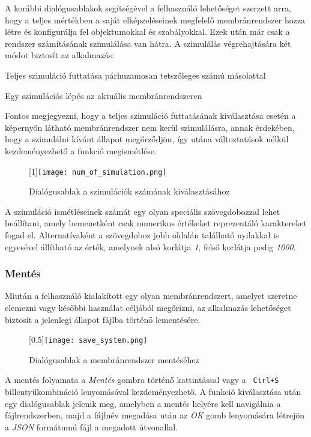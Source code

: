 A korábbi dialógusablakok segítségével a felhasználó lehetőséget szerzett arra, hogy a teljes mértékben a saját elképzeléseinek megfelelő membránrendszer hozza létre és konfigurálja fel objektumokkal és szabályokkal. Ezek után már csak a rendszer számításának szimulálása van hátra. A szimulálás végrehajtására két módot biztosít az alkalmazás:

\begin{compactenum}
\item Teljes szimuláció futtatása párhuzamosan tetszőleges számú másolattal 
\item Egy szimulációs lépés az aktuális membránrendszeren
\end{compactenum}

Fontos megjegyezni, hogy a teljes szimuláció futtatásának kiválasztása esetén a képernyőn látható membránrendszer nem kerül szimulálásra, annak érdekében, hogy a szimulálni kívánt állapot megőrződjön, így utána változtatások nélkül kezdeményezhető a funkció megismétlése.

\begin{figure}[H]
	\centering
	\scalebox{1}[1]{\texttt{[image: num\_of\_simulation.png]}}
	\caption{Dialógusablak a szimulációk számának kiválasztásához}
	\label{fig:num_of_sim}
\end{figure}

A szimuláció ismétléseinek számát egy olyan speciális szövegdobozzal lehet beállítani, amely bemenetként csak numerikus értékeket reprezentáló karaktereket fogad el. Alternatívaként a szövegdoboz jobb oldalán található nyilakkal is egyesével állítható az érték, amelynek alsó korlátja \textit{1}, felső korlátja pedig \textit{1000}.
 
\subsubsection{Mentés}
Miután a felhasználó kialakított egy olyan membránrendszert, amelyet szeretne elemezni vagy későbbi használat céljából megőrizni, az alkalmazás lehetőséget biztosít a jelenlegi állapot fájlba történő lementésére.

\begin{figure}[H]
	\centering
	\scalebox{0.5}[0.5]{\texttt{[image: save\_system.png]}}
	\caption{Dialógusablak a membránrendszer mentéséhez}
	\label{fig:save_system}
\end{figure}

A mentés folyamata a \textit{Mentés} gombra történő kattintással vagy a \verb| Ctrl+S| billentyűkombináció lenyomásával kezdeményezhető. A funkció kiválasztása után egy dialógusablak jelenik meg, amelyben a mentés helyére kell navigálnia a fájlrendszerben, majd a fájlnév megadása után az \textit{OK} gomb lenyomására létrejön a \textit{JSON} formátumú fájl a megadott útvonallal.

